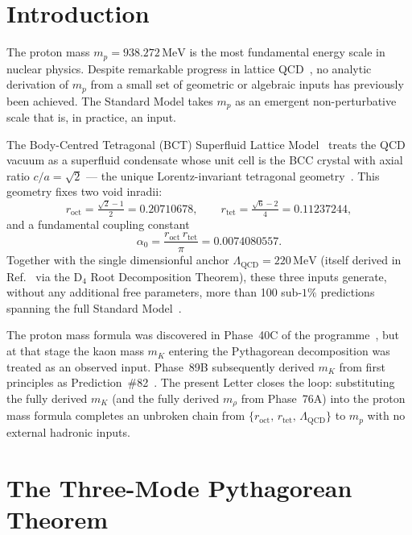 \documentclass[twocolumn,10pt,a4paper]{article}
\begin{document}
\section{Introduction}

The proton mass $m_p = 938.272\,\mathrm{MeV}$ is the most fundamental
energy scale in nuclear physics.  Despite remarkable progress in lattice
QCD~\cite{Durr2008}, no analytic derivation of $m_p$ from a small set of
geometric or algebraic inputs has previously been achieved.  The Standard
Model takes $m_p$ as an emergent non-perturbative scale that is, in
practice, an input.

The Body-Centred Tetragonal (BCT) Superfluid Lattice Model~\cite{monograph}
treats the QCD vacuum as a superfluid condensate whose unit cell is the
BCC crystal with axial ratio $c/a = \sqrt{2}$ — the unique Lorentz-invariant
tetragonal geometry~\cite{letter1}.  This geometry fixes two void inradii:
\begin{equation}
  r_\mathrm{oct} = \tfrac{\sqrt{2}-1}{2} = 0.20710678,\qquad
  r_\mathrm{tet} = \tfrac{\sqrt{6}-2}{4}  = 0.11237244,
\end{equation}
and a fundamental coupling constant
\begin{equation}
  \alpha_0 = \frac{r_\mathrm{oct}\,r_\mathrm{tet}}{\pi} = 0.0074080557.
\end{equation}
Together with the single dimensionful anchor $\Lambda_\mathrm{QCD} = 220\,\mathrm{MeV}$
(itself derived in Ref.~\cite{monograph} via the D$_4$ Root Decomposition
Theorem), these three inputs generate, without any additional free
parameters, more than 100 sub-$1\%$ predictions spanning the full Standard
Model~\cite{prl_letter}.

The proton mass formula was discovered in Phase~40C of the
programme~\cite{monograph}, but at that stage the kaon mass $m_K$
entering the Pythagorean decomposition was treated as an observed input.
Phase~89B subsequently derived $m_K$ from first principles as
Prediction~\#82~\cite{monograph}.  The present Letter closes the loop:
substituting the fully derived $m_K$ (and the fully derived $m_\rho$ from
Phase~76A) into the proton mass formula completes an unbroken chain from
$\{r_\mathrm{oct},\,r_\mathrm{tet},\,\Lambda_\mathrm{QCD}\}$ to $m_p$ with
no external hadronic inputs.

\section{The Three-Mode Pythagorean Theorem}
\end{document}
